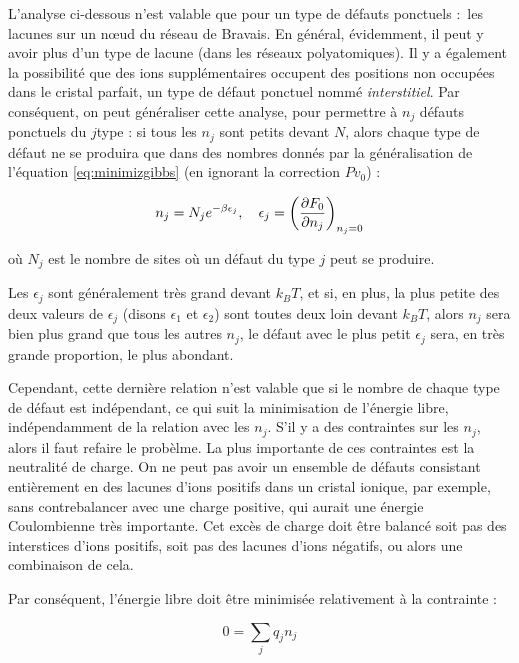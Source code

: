 L'analyse ci-dessous n'est valable que pour un type de défauts ponctuels : les lacunes sur un nœud du réseau de Bravais. En général, évidemment, il peut y avoir plus d'un type de lacune (dans les réseaux polyatomiques). Il y a également la possibilité que des ions supplémentaires occupent des positions non occupées dans le cristal parfait, un type de défaut ponctuel nommé \emph{interstitiel}. Par conséquent, on peut généraliser cette analyse, pour permettre à $n_j$ défauts ponctuels du $j$\ieme type : si tous les $n_j$ sont petits devant $N$, alors chaque type de défaut ne se produira que dans des nombres donnés par la généralisation de l'équation \ref{eq:minimizgibbs} (en ignorant la correction $P v_0$) :

\begin{equation}
    n_j = N_j e^{-\beta \epsilon_j},\quad \epsilon_j = \left( \frac{\partial F_0}{\partial n_j} \right)_{n_j=0}
\end{equation}

où $N_j$ est le nombre de sites où un défaut du type $j$ peut se produire.

Les $\epsilon_j$ sont généralement très grand devant $k_B T$, et si, en plus, la plus petite des deux valeurs de $\epsilon_j$ (disons $\epsilon_1$ et $\epsilon_2$) sont toutes deux loin devant $k_B T$, alors $n_j$ sera bien plus grand que tous les autres $n_j$, \ie le défaut avec le plus petit $\epsilon_j$ sera, en très grande proportion, le plus abondant.

Cependant, cette dernière relation n'est valable que si le nombre de chaque type de défaut est indépendant, ce qui suit la minimisation de l'énergie libre, indépendamment de la relation avec les $n_j$. S'il y a des contraintes sur les $n_j$, alors il faut refaire le probèlme.
La plus importante de ces contraintes est la neutralité de charge. On ne peut pas avoir un ensemble de défauts consistant entièrement en des lacunes d'ions positifs dans un cristal ionique, par exemple, sans contrebalancer avec une charge positive, qui aurait une énergie Coulombienne très importante. Cet excès de charge doit être balancé soit pas des interstices d'ions positifs, soit pas des lacunes d'ions négatifs, ou alors une combinaison de cela.

Par conséquent, l'énergie libre doit être minimisée relativement à la contrainte :

\begin{equation}
    0 = \sum_j q_j n_j
    \label{eq:minimisfreeenerg}
\end{equation}

